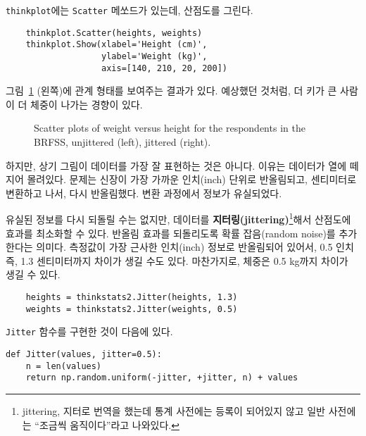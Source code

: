 
{\tt thinkplot}에는 {\tt Scatter} 메쏘드가 있는데, 산점도를 그린다.
%
\begin{verbatim}
    thinkplot.Scatter(heights, weights)
    thinkplot.Show(xlabel='Height (cm)',
                   ylabel='Weight (kg)',
                   axis=[140, 210, 20, 200])
\end{verbatim}

그림~\ref{scatter1} (왼쪽)에 관계 형태를 보여주는 결과가 있다.
예상했던 것처럼, 더 키가 큰 사람이 더 체중이 나가는 경향이 있다.

\begin{figure}
\caption{Scatter plots of weight versus height for the respondents
in the BRFSS, unjittered (left), jittered (right).}
\label{scatter1}
\end{figure}

하지만, 상기 그림이 데이터를 가장 잘 표현하는 것은 아니다.
이유는 데이터가 열에 떼지어 몰려있다. 문제는 
신장이 가장 가까운 인치(inch) 단위로 반올림되고, 센티미터로 변환하고 나서,
다시 반올림했다. 변환 과정에서 정보가 유실되었다.


유실된 정보를 다시 되돌릴 수는 없지만, 데이터를 {\bf 지터링(jittering)}\footnote{jittering, 지터로 번역을 했는데 통계 사전에는 등록이 되어있지 않고 일반 사전에는 ``조금씩 움직이다''라고 나와있다.}해서 
산점도에 효과를 최소화할 수 있다. 반올림 효과를 되돌리도록 확률 잡음(random noise)를 추가한다는 의미다.
측정값이 가장 근사한 인치(inch) 정보로 반올림되어 있어서, 0.5 인치 즉, 1.3 센티미터까지 차이가 생길 수도 있다. 마찬가지로, 체중은 0.5 kg까지 차이가 생길 수 있다. 


%
\begin{verbatim}
    heights = thinkstats2.Jitter(heights, 1.3)
    weights = thinkstats2.Jitter(weights, 0.5)
\end{verbatim}

{\tt Jitter} 함수를 구현한 것이 다음에 있다.

\begin{verbatim}
def Jitter(values, jitter=0.5):
    n = len(values)
    return np.random.uniform(-jitter, +jitter, n) + values
\end{verbatim}

